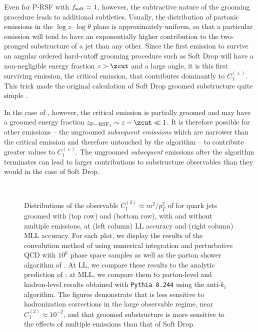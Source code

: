 Even for P-RSF with \(f_{\rm soft} = 1\), however, the subtractive nature of the grooming procedure leads to additional subtleties.
%
Usually, the distribution of partonic emissions in the \(\log z\)--\(\log \theta \) plane is approximately uniform, so that a particular emission will tend to have an exponentially higher contribution to the two-pronged substructure of a jet than any other.
%
Since the first emission to survive an angular ordered hard-cutoff grooming procedure such as Soft Drop will have a non-negligible energy fraction \(z > \zcut\) and a large angle, it is this first surviving emission, the critical emission, that contributes dominantly to \(C_1^{(\varsigma)}\).
%
This trick made the original calculation of Soft Drop groomed substructure quite simple \cite{Larkoski:2014wba}.

In the case of , however, the critical emission is partially groomed and may have a groomed energy fraction \(z_{\rm P-RSF_{1}} \sim z - \zcut \ll 1\).
%
It is therefore possible for other emissions -- the ungroomed \textit{subsequent emissions} which are narrower than the critical emission and therefore untouched by the  algorithm -- to contribute greater values to \(C_1^{(\varsigma)}\).
%
The ungroomed \textit{subsequent} emissions after the  algorithm terminates can lead to larger contributions to substructure observables than they would in the case of Soft Drop.

\begin{figure}[t!]
\centering
%
\\
%
%
\caption{
Distributions of the observable \(C_1^{(2)}\approx m^2 / p_T^2\) of  for quark jets groomed with  (top row) and  (bottom row), with and without multiple emissions, at (left column) LL accuracy and (right column) MLL accuracy.
%
For each plot, we display the results of the convolution method of  using numerical integration and perturbative QCD with \(10^6\) phase space samples as well as the parton shower algorithm of .
%
At LL, we compare these results to the analytic prediction of ;
%
at MLL, we compare them to parton-level and hadron-level results obtained with \texttt{Pythia 8.244} using the anti-\(k_t\) algorithm.
%
The figures demonstrate that  is less sensitive to hadronization corrections in the large observable regime, near \(C_1^{(2)} \approx 10^{-2}\), and that  groomed substructure is more sensitive to the effects of multiple emissions than that of Soft Drop.
}
\label{fig:Calculations}
\end{figure}

